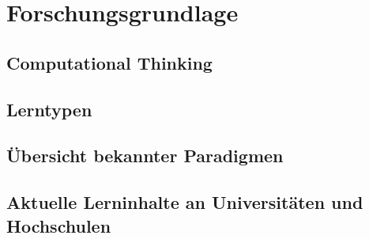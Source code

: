 \clearpage
\section{Forschungsgrundlage}
\label{sec:research}

\subsection{Computational Thinking}

\subsection{Lerntypen}

\subsection{Übersicht bekannter Paradigmen}

\subsection{Aktuelle Lerninhalte an Universitäten und Hochschulen}